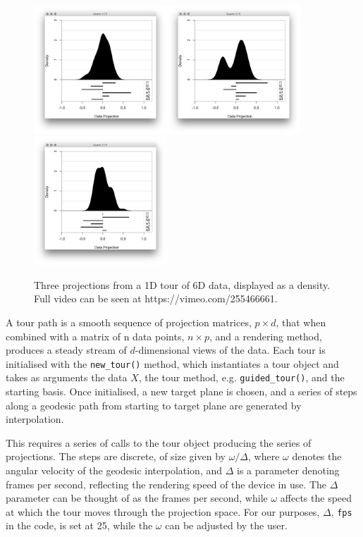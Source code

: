 \begin{figure}[ht]
\centerline{\includegraphics[width=5cm]{figures/tour1.png}\includegraphics[width=5cm]{figures/tour2.png}\includegraphics[width=5cm]{figures/tour3.png}}
\caption{Three projections from a 1D tour of 6D data, displayed as a density. Full video can be seen at https://vimeo.com/255466661.}
\label{tour}
\end{figure}

A tour path is a smooth sequence of projection matrices, \(p\times d\),
that when combined with a matrix of n data points, \(n\times p\), and a
rendering method, produces a steady stream of \(d\)-dimensional views of
the data. Each tour is initialised with the \texttt{new\_tour()} method,
which instantiates a tour object and takes as arguments the data \(X\),
the tour method, e.g. \texttt{guided\_tour()}, and the starting basis.
Once initialised, a new target plane is chosen, and a series of steps
along a geodesic path from starting to target plane are generated by
interpolation.

This requires a series of calls to the tour object producing the series
of projections. The steps are discrete, of size given by
\(\omega/\Delta\), where \(\omega\) denotes the angular velocity of the
geodesic interpolation, and \(\Delta\) is a parameter denoting frames
per second, reflecting the rendering speed of the device in use. The
\(\Delta\) parameter can be thought of as the frames per second, while
\(\omega\) affects the speed at which the tour moves through the
projection space. For our purposes, \(\Delta\), \texttt{fps} in the
code, is set at 25, while the \(\omega\) can be adjusted by the user.

